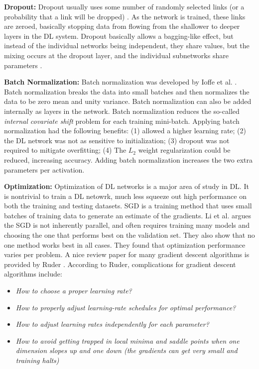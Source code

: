 \documentclass[12pt]{spieman}
\begin{document}
\begin{spacing}{1}
\textbf{Dropout:} Dropout usually uses some number of randomly selected links (or a probability that a link will be dropped) \cite{Srivastava2014Dropout} . As the network is trained, these links are zeroed, basically stopping data from flowing from the shallower to deeper layers in the DL system. Dropout basically allows a bagging-like effect, but instead of the individual networks being independent, they share values, but the mixing occurs at the dropout layer, and the individual subnetworks share parameters \cite{goodfellow2016deep} .

\textbf{Batch Normalization:} Batch normalization was developed by Ioffe et al. \cite{ioffe2015batch}. Batch normalization breaks the data into small batches and then normalizes the data to be zero mean and unity variance. Batch normalization can also be added internally as layers in the network. Batch normalization reduces the so-called \textit{internal covariate shift} problem for each training mini-batch. Applying batch normalization had the following benefits: (1) allowed a higher learning rate; (2) the DL network was not as sensitive to initialization; (3) dropout was not required to mitigate overfitting; (4) The $L_{2}$ weight regularization could be reduced, increasing accuracy. Adding batch normalization increases the two extra parameters per activation.

\textbf{Optimization:} Optimization of DL networks is a major area of study in DL. It is nontrivial to train a DL netowrk, much less squeeze out high performance on both the training and testing datasets. SGD is a training method that uses small batches of training data to generate an estimate of the gradients. Li et al. \cite{Le2011Optimization} argues the SGD is not inherently parallel, and often requires training many models and choosing the one that performs best on the validation set. They also show that no one method works best in all cases. They found that optimization performance varies per problem. A nice review paper for many gradient descent algorithms is provided by Ruder \cite{ruder2016overview} . According to Ruder, complications for gradient descent algorithms include:

\begin{itemize}
    \setlength{\parskip}{0pt}
    \setlength{\itemsep}{0pt plus 1pt}
    \item \textit{How to choose a proper learning rate?}
    \item \textit{How to properly adjust learning-rate schedules for optimal performance? }
    \item \textit{How to adjust learning rates independently for each parameter?}
    \item \textit{How to avoid getting trapped in local minima and saddle points when one dimension slopes up and one down (the gradients can get very small and training halts)}
\end{itemize}


\end{spacing}
\end{document}
